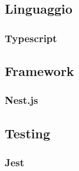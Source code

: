 \subsection{Linguaggio}
\subsubsection{Typescript}

\subsection{Framework}
\subsubsection{Nest.js}

\subsection{Testing}
\subsubsection{Jest}

